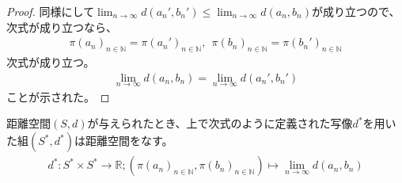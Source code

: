 \documentclass[dvipdfmx]{jsarticle}
\begin{document}
\begin{proof}
同様にして$\lim_{n \rightarrow \infty}{d\left( a_{n}',b_{n}' \right)} \leq \lim_{n \rightarrow \infty}{d\left( a_{n},b_{n} \right)}$が成り立つので、次式が成り立つなら、
\begin{align*}
\pi\left( a_{n} \right)_{n \in \mathbb{N}} = \pi\left( a_{n}' \right)_{n \in \mathbb{N}},\ \ \pi\left( b_{n} \right)_{n \in \mathbb{N}} = \pi\left( b_{n}' \right)_{n \in \mathbb{N}}
\end{align*}
次式が成り立つ。
\begin{align*}
\lim_{n \rightarrow \infty}{d\left( a_{n},b_{n} \right)} = \lim_{n \rightarrow \infty}{d\left( a_{n}',b_{n}' \right)}
\end{align*}
ことが示された。
\end{proof}
\begin{thm}\label{8.2.6.4}
距離空間$(S,d)$が与えられたとき、上で次式のように定義された写像$d^{*}$を用いた組$\left( S^{*},d^{*} \right)$は距離空間をなす。
\begin{align*}
d^{*}:S^{*} \times S^{*} \rightarrow \mathbb{R};\left( \pi\left( a_{n} \right)_{n \in \mathbb{N}},\pi\left( b_{n} \right)_{n \in \mathbb{N}} \right) \mapsto \lim_{n \rightarrow \infty}{d\left( a_{n},b_{n} \right)}
\end{align*}
\end{thm}
\end{document}
